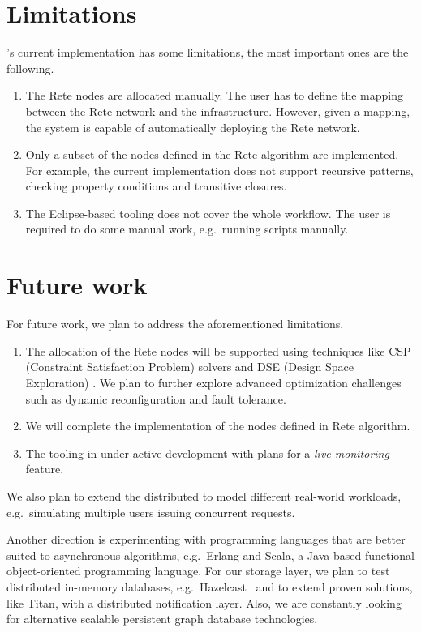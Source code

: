 \section{Limitations}

\iqd{}'s current implementation has some limitations, the most important ones are the following.

\begin{enumerate}
  \item The Rete nodes are allocated manually. The user has to define the mapping between the Rete network and the infrastructure. However, given a mapping, the system is capable of automatically deploying the Rete network.
  \item Only a subset of the nodes defined in the Rete algorithm are implemented. For example, the current implementation does not support recursive patterns, checking property conditions and transitive closures.
  \item The Eclipse-based tooling does not cover the whole workflow. The user is required to do some manual work, e.g.\ running scripts manually.
\end{enumerate}

\section{Future work}
\label{future-work}

For future work, we plan to address the aforementioned limitations.

\begin{enumerate}
  \item The allocation of the Rete nodes will be supported using techniques like CSP (Constraint Satisfaction Problem) solvers and DSE (Design Space Exploration) \cite{DSE11}. We plan to further explore advanced optimization challenges such as dynamic reconfiguration and fault tolerance.
  \item We will complete the implementation of the nodes defined in Rete algorithm.
  \item The tooling in under active development with plans for a \emph{live monitoring} feature.
\end{enumerate}

We also plan to extend the distributed \tb{} to model different real-world workloads, e.g.\ simulating multiple users issuing concurrent requests.

Another direction is experimenting with programming languages that are better suited to asynchronous algorithms, e.g.\ Erlang and Scala, a Java-based functional object-oriented programming language.
For our storage layer, we plan to test distributed in-memory databases, e.g.\ Hazelcast~\cite{Hazelcast} and to extend proven solutions, like Titan, with a distributed notification layer.
Also, we are constantly looking for alternative scalable persistent graph database technologies. 
